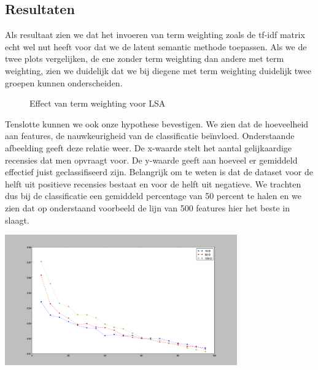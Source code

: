 \subsection{Resultaten}\label{Resultaten}

Als resultaat zien we dat het invoeren van term weighting zoals de tf-idf matrix echt wel nut heeft voor dat we de latent semantic methode toepassen.
Als we de twee plots vergelijken, de ene zonder term weighting dan andere met term weighting, zien we duidelijk dat we bij diegene met term weighting duidelijk twee groepen kunnen onderscheiden.

\begin{figure}%
    \centering
    \qquad
    \caption{Effect van term weighting voor LSA}%
    \label{fig:example}%
\end{figure}
%
Tenslotte kunnen we ook onze hypothese bevestigen. We zien dat de hoeveelheid aan features, de nauwkeurigheid van de classificatie beïnvloed. Onderstaande afbeelding geeft deze relatie weer. De x-waarde stelt het aantal gelijkaardige recensies dat men opvraagt voor. De y-waarde geeft aan hoeveel er gemiddeld effectief juist geclassifiseerd zijn. Belangrijk om te weten is dat de dataset voor de helft uit positieve recensies bestaat en voor de helft uit negatieve. We trachten dus bij de classificatie een gemiddeld percentage van 50 percent te halen en we zien dat op onderstaand voorbeeld de lijn van 500 features hier het beste in slaagt.


\begin{center}
  \includegraphics[width=10cm]{experiment_3}
\end{center}